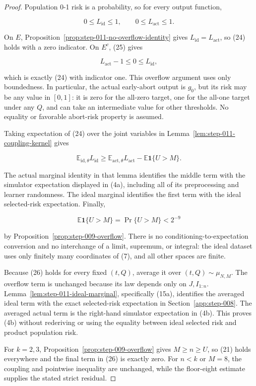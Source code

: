 \begin{proof}
Population 0-1 risk is a probability, so for every output function,

\[
  0\le L_{\mathrm{id}}\le1,
  \qquad
  0\le L_{\mathrm{act}}\le1.
\tag{25}
\]

On \(E\), Proposition~\ref{prop:step-011-no-overflow-identity} gives
\(L_{\mathrm{id}}=L_{\mathrm{act}}\), so (24) holds with a zero
indicator. On \(E^c\), (25) gives

\[
  L_{\mathrm{act}}-1\le0\le L_{\mathrm{id}},
\]

which is exactly (24) with indicator one. This overflow argument uses only
boundedness. In particular, the actual early-abort output is \(g_0\), but
its risk may be any value in \([0,1]\): it is zero for the all-zero target,
one for the all-one target under any \(Q\), and can take an intermediate
value for other thresholds. No equality or favorable abort-risk property
is assumed.

Taking expectation of (24) over the joint variables in
Lemma~\ref{lem:step-011-coupling-kernel} gives

\[
  \mathbb E_{\mathrm{id},\theta}L_{\mathrm{id}}
  \ge
  \mathbb E_{\mathrm{act},\theta}L_{\mathrm{act}}
  -\mathbb E\mathbf1\{U>M\}.
\tag{26}
\]

The actual marginal identity in that lemma identifies the middle term with
the simulator expectation displayed in (4a), including all of its
preprocessing and learner randomness. The ideal marginal identifies the
first term with the ideal selected-risk expectation. Finally,

\[
  \mathbb E\mathbf1\{U>M\}=\Pr\{U>M\}<2^{-9}
\tag{27}
\]

by Proposition~\ref{prop:step-009-overflow}. There is no conditioning-to-expectation
conversion and no interchange of a limit, supremum, or integral: the
ideal dataset uses only finitely many coordinates of (7), and all other
spaces are finite.

Because (26) holds for every fixed \((t,Q)\), average it over
\((t,Q)\sim\mu_{N,M}\). The overflow term is unchanged because its law
depends only on \(J,I_{1:n}\). Lemma~\ref{lem:step-011-ideal-marginal},
specifically (15a), identifies the averaged ideal term with the exact
selected-risk expectation in Section~\ref{app:step-008}. The averaged
actual term is
the right-hand simulator expectation in (4b). This proves (4b) without
rederiving or using the equality between ideal selected risk and
product population risk.

For \(k=2,3\), Proposition~\ref{prop:step-009-overflow} gives
\(M\ge n\ge U\), so (21) holds everywhere and the final term in (26) is
exactly zero. For \(n<k\) or \(M=8\), the coupling and pointwise inequality
are unchanged, while the floor-eight estimate supplies the stated
strict residual. \end{proof}
